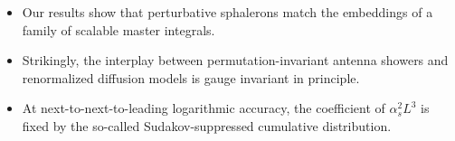 \begin{itemize}
  \item Our results show that perturbative sphalerons match the embeddings of a family of scalable master integrals.
  \item Strikingly, the interplay between permutation-invariant antenna showers and renormalized diffusion models is gauge invariant in principle.
  \item At next-to-next-to-leading logarithmic accuracy, the coefficient of $\alpha_s^2 L^3$ is fixed by the so-called Sudakov-suppressed cumulative distribution.
\end{itemize}


